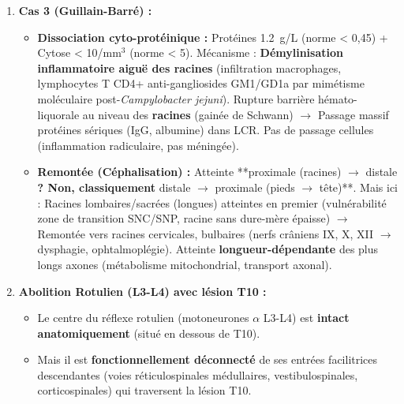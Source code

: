 \documentclass[11pt]{article}
\begin{document}
\begin{exoresolu}
\begin{enumerate}
\begin{itemize}
        \item \textbf{Cas 2 (Lésion segmentaire + sus-segmentaire aiguë - Choc Spinal) :} La lésion \textbf{détruit les corps cellulaires des motoneurones} (cornes antérieures T10) ET \textbf{sectionne les voies descendantes} (pyramidales, réticulospinales, vestibulospinales) qui apportent la \textbf{facilitation tonique} (glutamate, sérotonine, noradrénaline) nécessaire au maintien de l'excitabilité basale des motoneurones lombaires (L3-S1) intacts mais \textbf{désafferentés supraspinalement}. Brutale chute de l'excitabilité $\rightarrow$ \textbf{Aréflexie totale (Choc spinal)}, paralysie flasque. \textit{Note : Si survie, hyperréflexie spastique apparaîtra en 2-6 semaines (supersensibilité déafferentation).}
    \end{itemize}
    \item \textbf{Cas 3 (Guillain-Barré) :}
    \begin{itemize}
        \item \textbf{Dissociation cyto-protéinique :} Protéines \SI{1,2}{g/L} (norme < 0,45) + Cytose < 10/mm$^3$ (norme < 5). Mécanisme : \textbf{Démylinisation inflammatoire aiguë des racines} (infiltration macrophages, lymphocytes T CD4+ anti-gangliosides GM1/GD1a par mimétisme moléculaire post-\textit{Campylobacter jejuni}). Rupture barrière hémato-liquorale au niveau des \textbf{racines} (gainée de Schwann) $\rightarrow$ Passage massif protéines sériques (IgG, albumine) dans LCR. Pas de passage cellules (inflammation radiculaire, pas méningée).
        \item \textbf{Remontée (Céphalisation) :} Atteinte **proximale (racines) $\rightarrow$ distale\textbf{ ? Non, classiquement }distale $\rightarrow$ proximale (pieds $\rightarrow$ tête)**. Mais ici : Racines lombaires/sacrées (longues) atteintes en premier (vulnérabilité zone de transition SNC/SNP, racine sans dure-mère épaisse) $\rightarrow$ Remontée vers racines cervicales, bulbaires (nerfs crâniens IX, X, XII $\rightarrow$ dysphagie, ophtalmoplégie). Atteinte \textbf{longueur-dépendante} des plus longs axones (métabolisme mitochondrial, transport axonal).
    \end{itemize}
    \item \textbf{Abolition Rotulien (L3-L4) avec lésion T10 :}
    \begin{itemize}
        \item Le centre du réflexe rotulien (motoneurones $\alpha$ L3-L4) est \textbf{intact anatomiquement} (situé en dessous de T10).
        \item Mais il est \textbf{fonctionnellement déconnecté} de ses entrées facilitrices descendantes (voies réticulospinales médullaires, vestibulospinales, corticospinales) qui traversent la lésion T10.

\end{itemize}
\end{enumerate}
\end{exoresolu}
\end{document}
